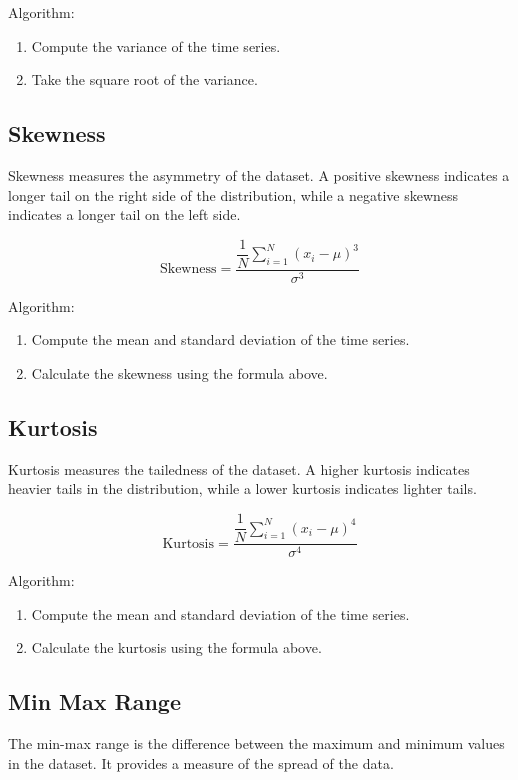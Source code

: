 Algorithm:
\begin{enumerate}
    \item Compute the variance of the time series.
    \item Take the square root of the variance.
\end{enumerate}

\subsection{Skewness}
Skewness measures the asymmetry of the dataset. A positive skewness indicates a longer tail on the right side of the distribution, while a negative skewness indicates a longer tail on the left side.

\begin{equation}
    \text{Skewness} = \dfrac{\dfrac{1}{N} \sum_{i=1}^{N} (x_i - \mu)^3}{\sigma^3}
    \label{eq:skewness}
\end{equation}

Algorithm:
\begin{enumerate}
    \item Compute the mean and standard deviation of the time series.
    \item Calculate the skewness using the formula above.
\end{enumerate}

\subsection{Kurtosis}
Kurtosis measures the tailedness of the dataset. A higher kurtosis indicates heavier tails in the distribution, while a lower kurtosis indicates lighter tails.

\begin{equation}
    \text{Kurtosis} = \dfrac{\dfrac{1}{N} \sum_{i=1}^{N} (x_i - \mu)^4}{\sigma^4}
    \label{eq:kurtosis}
\end{equation}

Algorithm:
\begin{enumerate}
    \item Compute the mean and standard deviation of the time series.
    \item Calculate the kurtosis using the formula above.
\end{enumerate}

\subsection{Min Max Range}
The min-max range is the difference between the maximum and minimum values in the dataset. It provides a measure of the spread of the data.

